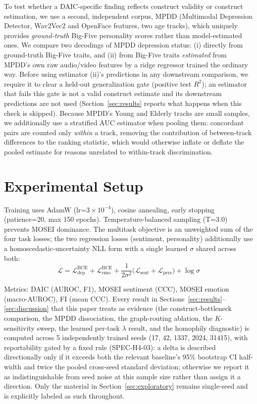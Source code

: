 \documentclass[twocolumn]{article}
\begin{document}
To test whether a DAIC-specific finding reflects construct validity or construct estimation, we use a second, independent corpus, MPDD (Multimodal Depression Detector, Wav2Vec2 and OpenFace features, two age tracks), which uniquely provides \emph{ground-truth} Big-Five personality scores rather than model-estimated ones. We compare two decodings of MPDD depression status: (i) directly from ground-truth Big-Five traits, and (ii) from Big-Five traits \emph{estimated} from MPDD's own raw audio/video features by a ridge regressor trained the ordinary way. Before using estimator (ii)'s predictions in any downstream comparison, we require it to clear a held-out generalization gate (positive test $R^2$); an estimator that fails this gate is not a valid construct estimate and its downstream predictions are not used (Section~\ref{sec:results} reports what happens when this check is skipped). Because MPDD's Young and Elderly tracks are small samples, we additionally use a stratified AUC estimator when pooling them: concordant pairs are counted only \emph{within} a track, removing the contribution of between-track differences to the ranking statistic, which would otherwise inflate or deflate the pooled estimate for reasons unrelated to within-track discrimination.

\section{Experimental Setup}
\label{sec:setup}

Training uses AdamW (lr=$3\times10^{-4}$), cosine annealing, early stopping (patience=20, max 150 epochs). Temperature-balanced sampling (T=3.0) prevents MOSEI dominance. The multitask objective is an unweighted sum of the four task losses; the two regression losses (sentiment, personality) additionally use a homoscedastic-uncertainty NLL form \citep{kendall2017uncertainties} with a single learned $\sigma$ shared across both:
\begin{equation}
    \mathcal{L} = \mathcal{L}_{\text{dep}}^{\text{BCE}} + \mathcal{L}_{\text{emo}}^{\text{BCE}} + \frac{1}{2\sigma^2}\big(\mathcal{L}_{\text{sent}} + \mathcal{L}_{\text{pers}}\big) + \log \sigma
\end{equation}

Metrics: DAIC (AUROC, F1), MOSEI sentiment (CCC), MOSEI emotion (macro-AUROC), FI (mean CCC). Every result in Sections~\ref{sec:results}--\ref{sec:discussion} that this paper treats as evidence (the construct-bottleneck comparison, the MPDD dissociation, the graph-routing ablation, the $K$-sensitivity sweep, the learned per-task $\lambda$ result, and the homophily diagnostic) is computed across 5 independently trained seeds (17, 42, 1337, 2024, 31415), with reportability gated by a fixed rule (SPEC-H4-03): a delta is described directionally only if it exceeds both the relevant baseline's 95\% bootstrap CI half-width and twice the pooled cross-seed standard deviation; otherwise we report it as indistinguishable from seed noise at this sample size rather than assign it a direction. Only the material in Section~\ref{sec:exploratory} remains single-seed and is explicitly labeled as such throughout.
\end{document}
